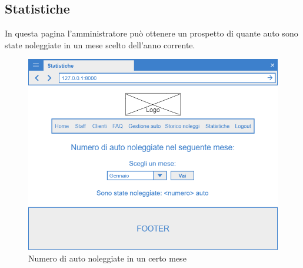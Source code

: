 \documentclass[12pt,a4paperS]{report}
\begin{document}
\begin{normalsize}
			\subsection{Statistiche}
				In questa pagina l'amministratore può ottenere un prospetto di quante auto sono state noleggiate in un mese scelto dell'anno corrente.
				\begin{figure}[H]
					\centering
					\includegraphics[width=1\textwidth, height=1\textheight, keepaspectratio]{Mockup/Statistiche.png}
					\caption{Numero di auto noleggiate in un certo mese}
				\end{figure}
			
	\end{normalsize}
	
\end{document}
